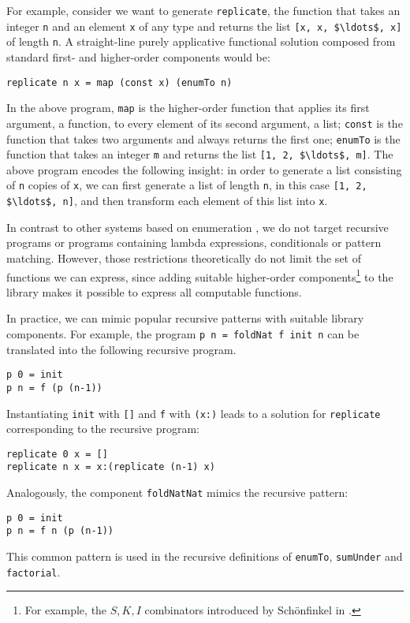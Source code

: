 For example, consider we want to generate \lstinline!replicate!, the function that takes an integer \lstinline!n! and an element \lstinline!x! of any type and returns the list \lstinline![x, x, $\ldots$, x]! of length \lstinline!n!. A straight-line purely applicative functional solution composed from standard first- and higher-order components would be:
\begin{lstlisting}[style=plain]
replicate n x = map (const x) (enumTo n)
\end{lstlisting}
In the above program, \lstinline!map! is the higher-order function that applies its first argument, a function, to every element of its second argument, a list; \lstinline!const! is the function that takes two arguments and always returns the first one; \lstinline!enumTo! is the function that takes an integer \lstinline!m! and returns the list \lstinline![1, 2, $\ldots$, m]!.
The above program encodes the following insight: in order to generate a list consisting of \lstinline!n! copies of \lstinline!x!, we can first generate a list of length \lstinline!n!, in this case \lstinline![1, 2, $\ldots$, n]!, and then transform each element of this list into \lstinline!x!.

In contrast to other systems based on enumeration \cite{MythPaper, LambdaSquarePaper}, we do not target recursive programs or programs containing lambda expressions, conditionals or pattern matching. However, those restrictions theoretically do not limit the set of functions we can express, since adding suitable higher-order components\footnote{For example, the $S, K, I$ combinators introduced by Schönfinkel in \cite{Schonfinkel1924}.} to the library makes it possible to express all computable functions.

In practice, we can mimic popular recursive patterns with suitable library components. For example, the program \lstinline!p n = foldNat f init n! can be translated into the following recursive program.
\begin{lstlisting}[style=plain]
p 0 = init
p n = f (p (n-1))
\end{lstlisting}
Instantiating \lstinline!init! with \lstinline![]! and \lstinline!f! with \lstinline!(x:)! leads to a solution for \lstinline!replicate! corresponding to the recursive program:
\begin{lstlisting}[style=plain]
replicate 0 x = []
replicate n x = x:(replicate (n-1) x)
\end{lstlisting}

Analogously, the component \lstinline!foldNatNat! mimics the recursive pattern:
\begin{lstlisting}[style=plain]
p 0 = init
p n = f n (p (n-1))
\end{lstlisting}
This common pattern is used in the recursive definitions of \lstinline!enumTo!, \lstinline!sumUnder! and \lstinline!factorial!.

